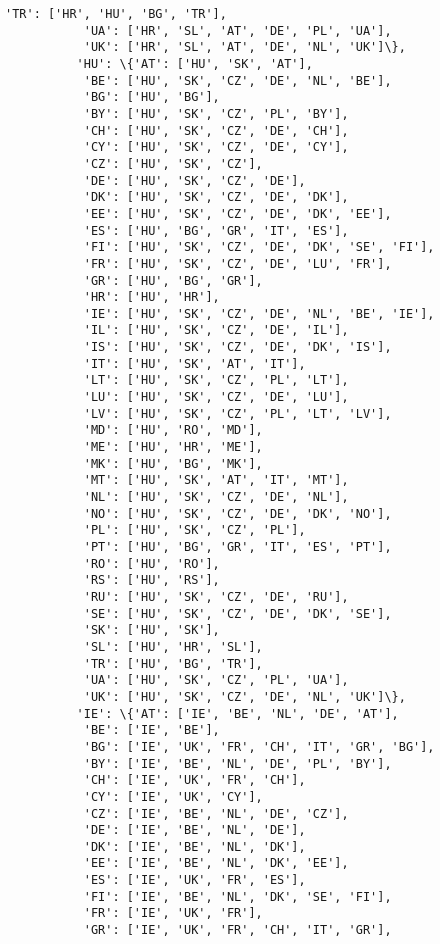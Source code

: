 \documentclass[11pt]{article}
\begin{document}
\begin{Verbatim}[commandchars=\\\{\}]
           'TR': ['HR', 'HU', 'BG', 'TR'],
           'UA': ['HR', 'SL', 'AT', 'DE', 'PL', 'UA'],
           'UK': ['HR', 'SL', 'AT', 'DE', 'NL', 'UK']\},
          'HU': \{'AT': ['HU', 'SK', 'AT'],
           'BE': ['HU', 'SK', 'CZ', 'DE', 'NL', 'BE'],
           'BG': ['HU', 'BG'],
           'BY': ['HU', 'SK', 'CZ', 'PL', 'BY'],
           'CH': ['HU', 'SK', 'CZ', 'DE', 'CH'],
           'CY': ['HU', 'SK', 'CZ', 'DE', 'CY'],
           'CZ': ['HU', 'SK', 'CZ'],
           'DE': ['HU', 'SK', 'CZ', 'DE'],
           'DK': ['HU', 'SK', 'CZ', 'DE', 'DK'],
           'EE': ['HU', 'SK', 'CZ', 'DE', 'DK', 'EE'],
           'ES': ['HU', 'BG', 'GR', 'IT', 'ES'],
           'FI': ['HU', 'SK', 'CZ', 'DE', 'DK', 'SE', 'FI'],
           'FR': ['HU', 'SK', 'CZ', 'DE', 'LU', 'FR'],
           'GR': ['HU', 'BG', 'GR'],
           'HR': ['HU', 'HR'],
           'IE': ['HU', 'SK', 'CZ', 'DE', 'NL', 'BE', 'IE'],
           'IL': ['HU', 'SK', 'CZ', 'DE', 'IL'],
           'IS': ['HU', 'SK', 'CZ', 'DE', 'DK', 'IS'],
           'IT': ['HU', 'SK', 'AT', 'IT'],
           'LT': ['HU', 'SK', 'CZ', 'PL', 'LT'],
           'LU': ['HU', 'SK', 'CZ', 'DE', 'LU'],
           'LV': ['HU', 'SK', 'CZ', 'PL', 'LT', 'LV'],
           'MD': ['HU', 'RO', 'MD'],
           'ME': ['HU', 'HR', 'ME'],
           'MK': ['HU', 'BG', 'MK'],
           'MT': ['HU', 'SK', 'AT', 'IT', 'MT'],
           'NL': ['HU', 'SK', 'CZ', 'DE', 'NL'],
           'NO': ['HU', 'SK', 'CZ', 'DE', 'DK', 'NO'],
           'PL': ['HU', 'SK', 'CZ', 'PL'],
           'PT': ['HU', 'BG', 'GR', 'IT', 'ES', 'PT'],
           'RO': ['HU', 'RO'],
           'RS': ['HU', 'RS'],
           'RU': ['HU', 'SK', 'CZ', 'DE', 'RU'],
           'SE': ['HU', 'SK', 'CZ', 'DE', 'DK', 'SE'],
           'SK': ['HU', 'SK'],
           'SL': ['HU', 'HR', 'SL'],
           'TR': ['HU', 'BG', 'TR'],
           'UA': ['HU', 'SK', 'CZ', 'PL', 'UA'],
           'UK': ['HU', 'SK', 'CZ', 'DE', 'NL', 'UK']\},
          'IE': \{'AT': ['IE', 'BE', 'NL', 'DE', 'AT'],
           'BE': ['IE', 'BE'],
           'BG': ['IE', 'UK', 'FR', 'CH', 'IT', 'GR', 'BG'],
           'BY': ['IE', 'BE', 'NL', 'DE', 'PL', 'BY'],
           'CH': ['IE', 'UK', 'FR', 'CH'],
           'CY': ['IE', 'UK', 'CY'],
           'CZ': ['IE', 'BE', 'NL', 'DE', 'CZ'],
           'DE': ['IE', 'BE', 'NL', 'DE'],
           'DK': ['IE', 'BE', 'NL', 'DK'],
           'EE': ['IE', 'BE', 'NL', 'DK', 'EE'],
           'ES': ['IE', 'UK', 'FR', 'ES'],
           'FI': ['IE', 'BE', 'NL', 'DK', 'SE', 'FI'],
           'FR': ['IE', 'UK', 'FR'],
           'GR': ['IE', 'UK', 'FR', 'CH', 'IT', 'GR'],

\end{Verbatim}
\end{document}
